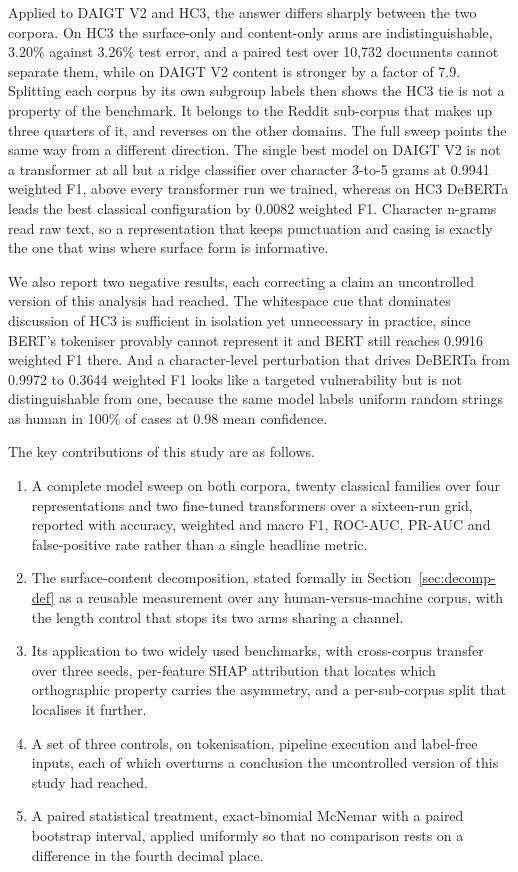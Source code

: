 \documentclass[conference,a4paper]{IEEEtran}
\begin{document}
Applied to DAIGT V2 and HC3, the answer differs sharply between the two corpora. On HC3 the surface-only and content-only arms are indistinguishable, 3.20\% against 3.26\% test error, and a paired test over 10,732 documents cannot separate them, while on DAIGT V2 content is stronger by a factor of 7.9. Splitting each corpus by its own subgroup labels then shows the HC3 tie is not a property of the benchmark. It belongs to the Reddit sub-corpus that makes up three quarters of it, and reverses on the other domains. The full sweep points the same way from a different direction. The single best model on DAIGT V2 is not a transformer at all but a ridge classifier over character 3-to-5 grams at 0.9941 weighted F1, above every transformer run we trained, whereas on HC3 DeBERTa leads the best classical configuration by 0.0082 weighted F1. Character n-grams read raw text, so a representation that keeps punctuation and casing is exactly the one that wins where surface form is informative.

We also report two negative results, each correcting a claim an uncontrolled version of this analysis had reached. The whitespace cue that dominates discussion of HC3 is sufficient in isolation yet unnecessary in practice, since BERT's tokeniser provably cannot represent it and BERT still reaches 0.9916 weighted F1 there. And a character-level perturbation that drives DeBERTa from 0.9972 to 0.3644 weighted F1 looks like a targeted vulnerability but is not distinguishable from one, because the same model labels uniform random strings as human in 100\% of cases at 0.98 mean confidence.

The key contributions of this study are as follows.
\begin{enumerate}
    \item A complete model sweep on both corpora, twenty classical families over four representations and two fine-tuned transformers over a sixteen-run grid, reported with accuracy, weighted and macro F1, ROC-AUC, PR-AUC and false-positive rate rather than a single headline metric.
    \item The surface-content decomposition, stated formally in Section~\ref{sec:decomp-def} as a reusable measurement over any human-versus-machine corpus, with the length control that stops its two arms sharing a channel.
    \item Its application to two widely used benchmarks, with cross-corpus transfer over three seeds, per-feature SHAP attribution that locates which orthographic property carries the asymmetry, and a per-sub-corpus split that localises it further.
    \item A set of three controls, on tokenisation, pipeline execution and label-free inputs, each of which overturns a conclusion the uncontrolled version of this study had reached.
    \item A paired statistical treatment, exact-binomial McNemar with a paired bootstrap interval, applied uniformly so that no comparison rests on a difference in the fourth decimal place.
\end{enumerate}
\end{document}
